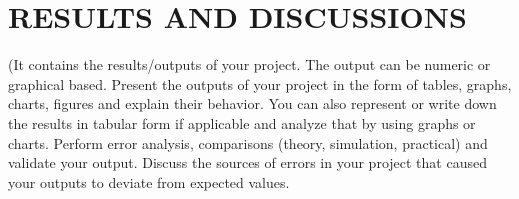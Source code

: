 \clearpage
\section{RESULTS AND DISCUSSIONS}

(It contains the results/outputs of your project. The output can be numeric or graphical based. Present the outputs of your project in the form of tables, graphs, charts, figures and explain their behavior. You can also represent or write down the results in tabular form if applicable and analyze that by using graphs or charts. Perform error analysis, comparisons (theory, simulation, practical) and validate your output. Discuss the sources of errors in your project that caused your outputs to deviate from expected values.



